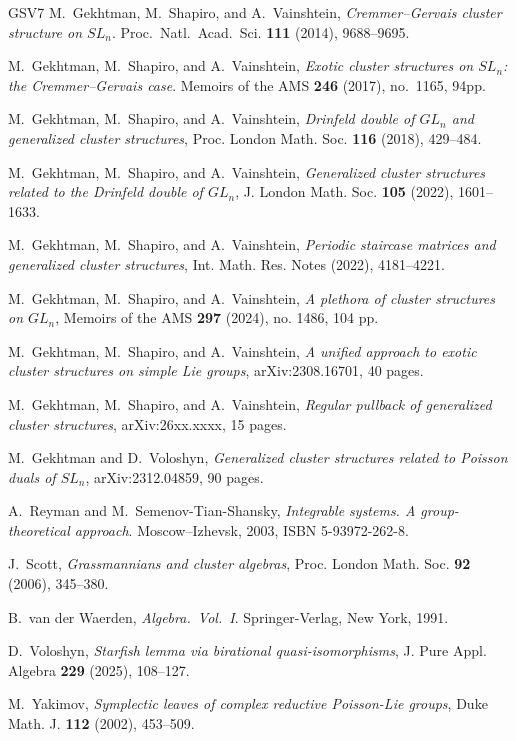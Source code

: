 \documentclass{amsart}
\theoremstyle{definition}
\theoremstyle{remark}
\numberwithin{equation}{section}
\numberwithin{theorem}{section}
\begin{document}
\begin{thebibliography}{GSV7}
  M.~Gekhtman, M.~Shapiro, and A.~Vainshtein,  
\textit{Cremmer--Gervais cluster structure on $SL_n$}.  
Proc.~Natl.~Acad.~Sci. \textbf{111} (2014), 9688--9695.

  M.~Gekhtman, M.~Shapiro, and A.~Vainshtein,  
\textit{Exotic cluster structures on $SL_n$: the Cremmer--Gervais case}.  
Memoirs of the AMS \textbf{246} (2017), no.~1165, 94pp.

 M.~Gekhtman, M.~Shapiro, and A.~Vainshtein,  \textit{Drinfeld double of $GL_n$ and generalized cluster structures}, Proc. London Math. Soc. \textbf{116} (2018), 429--484.

 M.~Gekhtman, M.~Shapiro, and A.~Vainshtein,  \textit{Generalized cluster structures related to the Drinfeld double of $GL_n$}, J. London Math. Soc. \textbf{105} (2022), 1601--1633.

  M.~Gekhtman, M.~Shapiro, and A.~Vainshtein, 
\textit{Periodic staircase matrices and generalized cluster structures},
Int. Math. Res. Notes (2022), 4181--4221.

  M.~Gekhtman, M.~Shapiro, and A.~Vainshtein,  
\textit{A plethora of cluster structures on $GL_n$}, 
Memoirs of the AMS {\bf 297} (2024), no. 1486, 104 pp.

 M.~Gekhtman, M.~Shapiro, and A.~Vainshtein, \textit{A unified approach to exotic cluster structures on simple Lie groups}, arXiv:2308.16701, 40 pages.

 M.~Gekhtman, M.~Shapiro, and A.~Vainshtein, \textit{Regular pullback of generalized cluster structures}, arXiv:26xx.xxxx, 15 pages.


   M.~Gekhtman and D.~Voloshyn, \textit{Generalized cluster structures related to Poisson duals of $SL_n$}, arXiv:2312.04859, 90 pages.

  A.~Reyman and M.~Semenov-Tian-Shansky,
\textit{Integrable systems. A group-theoretical approach}. Moscow--Izhevsk, 2003, ISBN 5-93972-262-8.

 J.~Scott, \textit{Grassmannians and cluster algebras}, Proc. London Math. Soc. {\bf 92} (2006),  345--380.

 B.~van der Waerden, \textit{Algebra.~Vol.~I}. Springer-Verlag, New York, 1991.

 D.~Voloshyn, {\it Starfish lemma via birational quasi-isomorphisms},  J. Pure Appl. Algebra 
\textbf{229} (2025), 108--127.


 M.~Yakimov, 
{\it Symplectic leaves of complex reductive Poisson-Lie groups}, Duke Math. J. \textbf{112} (2002),
453--509.

\end{thebibliography}
\end{document}
